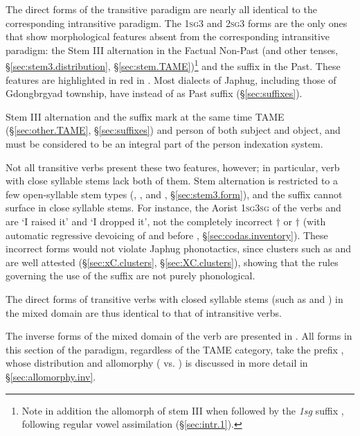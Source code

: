 The direct forms of the transitive paradigm are nearly all identical to the corresponding intransitive paradigm. The \textsc{1sg}\fl{}3 and \textsc{2sg}{}\fl{}3 forms are the only ones that show morphological features absent from the corresponding intransitive paradigm: the Stem III alternation in the Factual Non-Past (and other tenses, §\ref{sec:stem3.distribution}, §\ref{sec:stem.TAME})\footnote{Note in addition the allomorph  of stem III when followed by the \textit{1sg} suffix , following regular vowel assimilation (§\ref{sec:intr.1}). 
} and the  suffix in the Past. These features are highlighted in red in . Most dialects of Japhug, including those of Gdongbrgyad township, have  instead of  as Past suffix (§\ref{sec:suffixes}).

Stem III alternation and the  suffix mark at the same time TAME (§\ref{sec:other.TAME}, §\ref{sec:suffixes}) and person of both subject and object, and must be considered to be an integral part of the person indexation system.

Not all transitive verbs present these two features, however; in particular, verb with close syllable stems lack both of them. Stem alternation is restricted to a few open-syllable stem types (, ,  and , §\ref{sec:stem3.form}), and the  suffix cannot surface in close syllable stems. For instance, the Aorist \textsc{1sg}\fl{}\textsc{3sg} of the verbs  and  are  `I raised it' and  `I dropped it', not the completely incorrect $\dagger$ or $\dagger$ (with automatic regressive devoicing of  and  before , §\ref{sec:codas.inventory}). These incorrect forms  would not violate Japhug phonotactics, since clusters such as  and  are well attested (§\ref{sec:xC.clusters}, §\ref{sec:XC.clusters}), showing that the rules governing the use of the  suffix are not purely phonological.

The direct forms of transitive verbs with closed syllable stems (such as  and ) in the mixed domain are thus identical to that of intransitive verbs.

The inverse forms of the mixed domain of the verb  are presented in . All forms in this section of the paradigm, regardless of the TAME category, take the prefix , whose distribution and allomorphy ( vs. ) is discussed in more detail in §\ref{sec:allomorphy.inv}.

